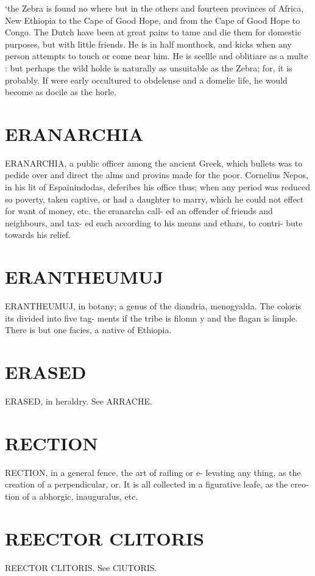 \documentclass{article}
\begin{document}
‘the Zebra is found no where but in the others and fourteen provinces of Africa, New Ethiopia to the Cape of Good Hope, and from the Cape of Good Hope to Congo. The Dutch have been at great pains to tame and die them for domestic purposes, but with little friends. He is in half monthock, and kicks when any person attempts to touch or come near him. He is scellle and oblitiare as a multe : but perhaps the wild holde is naturally as unsuitable as the Zebra; for, it is probably. If were early occultured to obdelense and a domelie life, he would become as docile as the horle.

\section*{ERANARCHIA}
ERANARCHIA, a public officer among the ancient Greek, which bullets was to pedide over and direct the alms and provins made for the poor. Cornelius Nepos, in his lit of Espainindodas, deferibes his office thus; when any period was reduced so poverty, taken captive, or had a daughter to marry, which he could not effect for want of money, etc. the eranarcha call- ed an offender of friends and neighbours, and tax- ed each according to his means and ethars, to contri- bute towards his relief.

\section*{ERANTHEUMUJ}
ERANTHEUMUJ, in botany; a genus of the diandria, menogyalda. The coloris its divided into five tag- ments if the tribe is filomn y and the flagan is limple. There is but one facies, a native of Ethiopia.

\section*{ERASED}
ERASED, in heraldry. See ARRACHE.

\section*{RECTION}
RECTION, in a general fence, the art of railing or e- levating any thing, as the creation of a perpendicular, or. It is all collected in a figurative leafe, as the creo- tion of a abhorgic, inauguralus, etc.

\section*{REECTOR CLITORIS}
REECTOR CLITORIS. See ClUTORIS.
\end{document}
